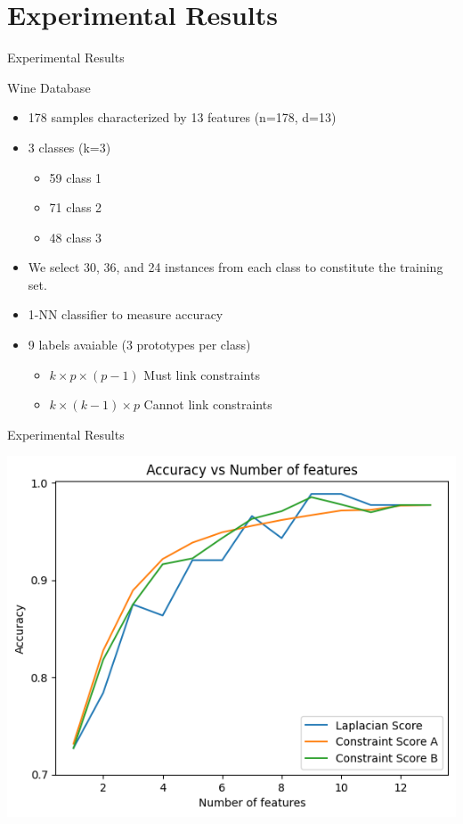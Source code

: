 \documentclass{beamer}
\begin{document}
\section{Experimental Results}
\begin{frame}{ Experimental Results}
    \begin{block}{Wine Database}
        \begin{itemize}
            \item 178 samples characterized by 13 features (n=178, d=13)
            \item 3 classes (k=3)
                \begin{itemize}
                    \item 59 class 1
                    \item 71 class 2
                    \item 48 class 3
                \end{itemize}
            \item We select 30, 36, and 24 instances from each class to constitute the training set.
            \item 1-NN classifier to measure accuracy
            \item 9 labels avaiable (3 prototypes per class)
                \begin{itemize}
                    \item $ k\times p\times(p-1) $ Must link constraints
                    \item $ k\times(k-1)\times p $ Cannot link constraints
                \end{itemize}
        \end{itemize}
    \end{block}
\end{frame}
\begin{frame}{Experimental Results}
    \begin{center}
    \includegraphics[height=0.8\textheight]{../Images/allscoresAB.png}
    \end{center}
\end{frame}
\end{document}

